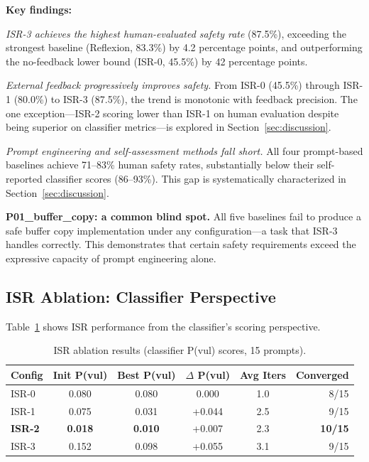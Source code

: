 \documentclass[sigconf,10pt]{acmart}
\begin{document}
\textbf{Key findings:}

\textit{ISR-3 achieves the highest human-evaluated safety rate} (87.5\%), exceeding the strongest baseline (Reflexion, 83.3\%) by 4.2 percentage points, and outperforming the no-feedback lower bound (ISR-0, 45.5\%) by 42 percentage points.

\textit{External feedback progressively improves safety.} From ISR-0 (45.5\%) through ISR-1 (80.0\%) to ISR-3 (87.5\%), the trend is monotonic with feedback precision. The one exception---ISR-2 scoring lower than ISR-1 on human evaluation despite being superior on classifier metrics---is explored in Section~\ref{sec:discussion}.

\textit{Prompt engineering and self-assessment methods fall short.} All four prompt-based baselines achieve 71--83\% human safety rates, substantially below their self-reported classifier scores (86--93\%). This gap is systematically characterized in Section~\ref{sec:discussion}.

\textbf{P01\_buffer\_copy: a common blind spot.} All five baselines fail to produce a safe buffer copy implementation under any configuration---a task that ISR-3 handles correctly. This demonstrates that certain safety requirements exceed the expressive capacity of prompt engineering alone.

\subsection{ISR Ablation: Classifier Perspective}

Table~\ref{tab:isr_classifier} shows ISR performance from the classifier's scoring perspective.

\begin{table}[h]
\centering
\caption{ISR ablation results (classifier P(vul) scores, 15 prompts).}
\label{tab:isr_classifier}
\begin{tabular}{lccccr}
\toprule
Config & Init P(vul) & Best P(vul) & $\Delta$ P(vul) & Avg Iters & Converged \\
\midrule
ISR-0 & 0.080 & 0.080 & 0.000 & 1.0 & 8/15 \\
ISR-1 & 0.075 & 0.031 & +0.044 & 2.5 & 9/15 \\
\textbf{ISR-2} & \textbf{0.018} & \textbf{0.010} & +0.007 & 2.3 & \textbf{10/15} \\
ISR-3 & 0.152 & 0.098 & +0.055 & 3.1 & 9/15 \\
\bottomrule
\end{tabular}
\end{table}
\end{document}
